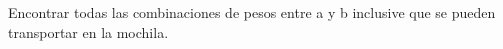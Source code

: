 Encontrar todas las combinaciones de pesos entre a y b inclusive que se pueden transportar en la mochila.